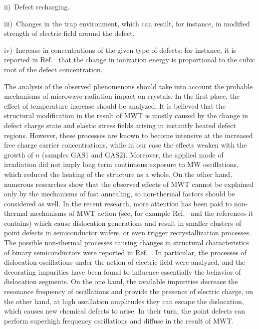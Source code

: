 \documentclass[%
 aip,jap,
 amsmath,amssymb,
 reprint,%
]{revtex4-1}
\begin{document}
\noindent
ii)~Defect recharging.

\noindent
iii)~Changes in the trap environment, which can result, for instance, in modified strength of electric field around the defect.

\noindent
iv)~Increase in concentrations of the given type of defects:
for instance, it is reported in Ref.~  that the change in ionization energy is proportional to the cubic root of the defect concentration.

The analysis of the observed phenomenons should take into account
the probable mechanisms of microwave radiation impact on crystals.
In the first place, the effect of temperature increase should be analyzed.
It is believed that the structural modification in the result of MWT  is mostly caused by the change
in defect charge state and elastic stress fields arising in instantly heated defect regions.
However, these processes are known to become intensive at the increased free charge carrier concentrations,\cite{MW:Rev}
while in our case the effects weaken with the growth of $n$ (samples GAS1 and GAS2).
Moreover, the applied mode of irradiation did not imply long term continuous exposure to MW oscillations,
which reduced the heating of the structure as a whole.
On the other hand, numerous researches show that the observed effects of MWT cannot be explained only by the mechanisms of fast  annealing,
so non-thermal factors should be considered as well.
In the recent research, more attention has been paid to non-thermal mechanisms of MWT action
(see, for example Ref.~ and the references it contains)
which cause dislocation generations and result in smaller  clusters of point defects in semiconductor wafers,\cite{Konakova2007JTFEn}
or even trigger recrystallization processes.\cite{MW:Si2018}
The possible non-thermal processes causing changes in structural characteristics of binary semiconductors were reported in Ref.~.
In particular, the processes of dislocation oscillations under the action of electric field were analyzed,
and the decorating impurities have been found to influence essentially the behavior of dislocation segments.
On the one hand, the available impurities decrease the resonance frequency of oscillations
and provide the presence of electric charge,
on the other hand, at high oscillation amplitudes they can escape the dislocation,
which causes new chemical defects to arise.
In their turn, the point defects can perform superhigh frequency oscillations and diffuse in the result of MWT.
\end{document}
